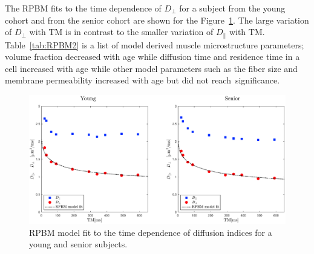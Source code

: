 The RPBM fits to the time dependence of $D_\perp$ for a subject from the young cohort and from the senior cohort are shown for the Figure~\ref{fig:RPBM fit}. The large variation of $D_\perp$ with TM is in contrast to the smaller variation of $D_\parallel$ with TM.
Table~\ref{tab:RPBM2} is a list of model derived muscle microstructure parameters; volume fraction decreased with age while diffusion time and residence time in a cell increased with age while other model parameters such as the fiber size and membrane permeability increased with age but did not reach~significance.
\begin{figure}[!htb]
\vspace{+0.2cm}
\centering
\includegraphics[width=\textwidth]{Figures/RPBM_fit.pdf}
\caption[RPBM model fit to the time dependence of diffusion indices for a young and senior subjects]{RPBM model fit to the time dependence of diffusion indices for a young and senior subjects.}
\label{fig:RPBM fit}
\end{figure}

